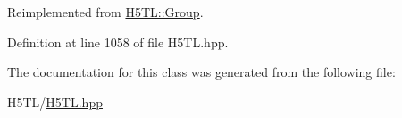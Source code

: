 Reimplemented from \hyperlink{class_h5_t_l_1_1_group_a33879ce41734238eb50b6917268d279d}{H5\-T\-L\-::\-Group}.



Definition at line 1058 of file H5\-T\-L.\-hpp.



The documentation for this class was generated from the following file\-:\begin{DoxyCompactItemize}
\item 
H5\-T\-L/\hyperlink{_h5_t_l_8hpp}{H5\-T\-L.\-hpp}\end{DoxyCompactItemize}
